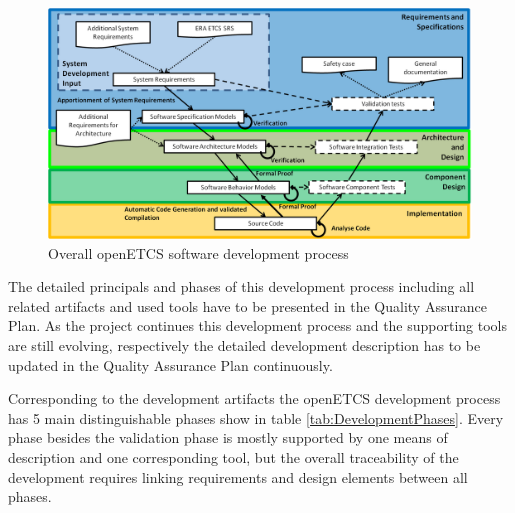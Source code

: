 \documentclass{template/openetcs_report}
\begin{document}
\begin{figure}[htbp]
\centering
\includegraphics[width=1.0\linewidth]{./images/openETCS-Software-Development_2-0}
\caption{Overall openETCS software development process}
\label{fig:DevopmentProcess}
\end{figure}



The detailed principals and phases of this development process including all related artifacts and used tools have to be presented in the Quality Assurance Plan.  As the project continues this development process and the supporting tools are still evolving, respectively the detailed development description has to be updated in the Quality Assurance Plan continuously.

Corresponding to the development artifacts the openETCS development process has 5 main distinguishable phases show in table \ref{tab:DevelopmentPhases}. Every phase besides the validation phase is mostly supported by one means of description and one corresponding tool, but the overall traceability of the development requires linking requirements and design elements between all phases. 
\end{document}
